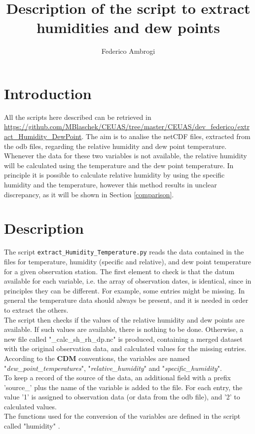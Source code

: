 \documentclass[a4paper,11pt]{article}
\author[a]{Federico Ambrogi}
\title{\boldmath Description of the script to extract humidities and dew points}
\begin{document}
 
	\sffamily
	\maketitle


\section{Introduction}
All the scripts here described can be retrieved in \url{https://github.com/MBlaschek/CEUAS/tree/master/CEUAS/dev_federico/extract_Humidity_DewPoint}.
The aim is to analise the netCDF files, extracted from the odb files, regarding the relative humidity and dew point temperature. Whenever the data for these two variables is not available, the relative humidity will be calculated using the temperature and the dew point temperature. In principle it is possible to calculate relative humidity by using the specific humidity and the temperature, however this method results in unclear discrepancy, as it will be shown in Section \ref{comparison}.

\section{Description}
The script \verb|extract_Humidity_Temperature.py| reads the data contained in the files for temperature, humidity (specific and relative), and dew point temperature for a given observation station. The first element to check is that the datum available for each variable, i.e. the array of observation dates, is identical, since in principles they can be different. For example, some entries might be missing. In general the temperature data should always be present, and it is needed in order to extract the others. 
\\

The script then checks if the values of the relative humidity and dew points are available. If such values are available, there is nothing to be done. Otherwise, a new file called "\_calc\_sh\_rh\_dp.nc" is produced, containing a merged dataset with the original observation data, and calculated values for the missing entries. According to the \textbf{CDM} conventions, the variables are named "\textit{dew\_point\_temperatures}", "\textit{relative\_humidity}" and "\textit{specific\_humidity}". 
\\
To keep a record of the source of the data, an additional field with a prefix 'source\_' plus the name of the variable is added to the file. For each entry, the value '1' is assigned to observation data (or data from the odb file), and '2' to calculated values. 
\\
The functions used for the conversion of the variables are defined in the script called "humidity" . 
\end{document}
